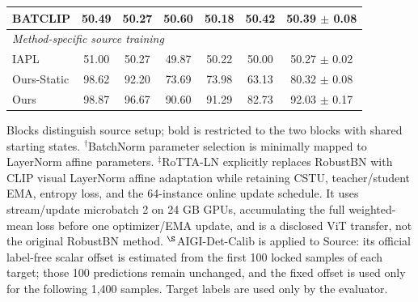 \begin{table}[t]
{\begin{tabular}{lcccccc}
BATCLIP & 50.49 & 50.27 & 50.60 & 50.18 & 50.42 & 50.39 $\pm$ 0.08 \\
\midrule
\multicolumn{7}{l}{\textit{Method-specific source training}} \\
IAPL & 51.00 & 50.27 & 49.87 & 50.22 & 50.00 & 50.27 $\pm$ 0.02 \\
Ours-Static & 98.62 & 92.20 & 73.69 & 73.98 & 63.13 & 80.32 $\pm$ 0.08 \\
Ours & 98.87 & 96.67 & 90.60 & 91.29 & 82.73 & 92.03 $\pm$ 0.17 \\
\bottomrule
\end{tabular}%
}
\vspace{2pt}
\parbox{\textwidth}{\footnotesize Blocks distinguish source setup; bold is restricted to the two blocks with shared starting states. $^{\dagger}$BatchNorm parameter selection is minimally mapped to LayerNorm affine parameters. $^{\ddagger}$RoTTA-LN explicitly replaces RobustBN with CLIP visual LayerNorm affine adaptation while retaining CSTU, teacher/student EMA, entropy loss, and the 64-instance online update schedule. It uses stream/update microbatch 2 on 24 GB GPUs, accumulating the full weighted-mean loss before one optimizer/EMA update, and is a disclosed ViT transfer, not the original RobustBN method. $^{\S}$AIGI-Det-Calib is applied to Source: its official label-free scalar offset is estimated from the first 100 locked samples of each target; those 100 predictions remain unchanged, and the fixed offset is used only for the following 1,400 samples. Target labels are used only by the evaluator.}
\end{table}
